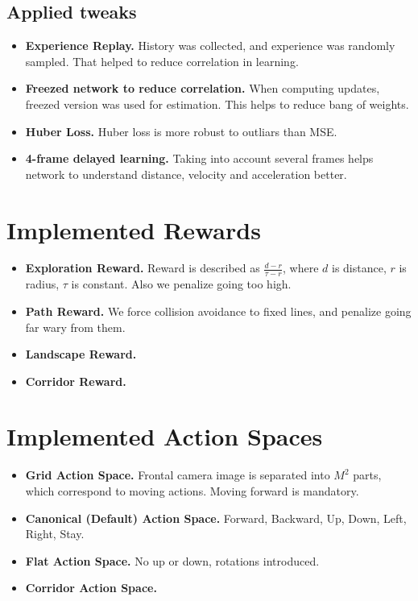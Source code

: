 \documentclass{article}
\begin{document}
\subsection{Applied tweaks}

\begin{itemize}
    \item {\bf Experience Replay.} History was collected, and experience was randomly sampled. That helped to reduce correlation in learning.
    \item {\bf Freezed network to reduce correlation.} When computing updates, freezed version was used for estimation. This helps 
        to reduce bang of weights.
    \item {\bf Huber Loss.} Huber loss is more robust 
        to outliars than MSE. 
    \item {\bf 4-frame delayed learning.} 
        Taking into account several frames helps network to understand 
        distance, velocity and acceleration better.
\end{itemize}

\section{Implemented Rewards}

\begin{itemize}
    \item {\bf Exploration Reward.} Reward is described as $\frac{d - r}{\tau - r}$, where $d$ is distance, $r$ is radius, $\tau$ is constant.
        Also we penalize going too high.
    \item {\bf Path Reward.} We force collision avoidance to fixed lines, and penalize going far wary from them.
    \item {\bf Landscape Reward.}
    \item {\bf Corridor Reward.}
\end{itemize}

\section{Implemented Action Spaces}

\begin{itemize}
    \item {\bf Grid Action Space.} Frontal camera image is separated into $M^2$ parts, which correspond to moving actions. Moving forward is
        mandatory.
    \item {\bf Canonical (Default) Action Space.} Forward, Backward, Up, Down, Left, Right, Stay.
    \item {\bf Flat Action Space.} No up or down, rotations introduced.
    \item {\bf Corridor Action Space.}
\end{itemize}
\end{document}
